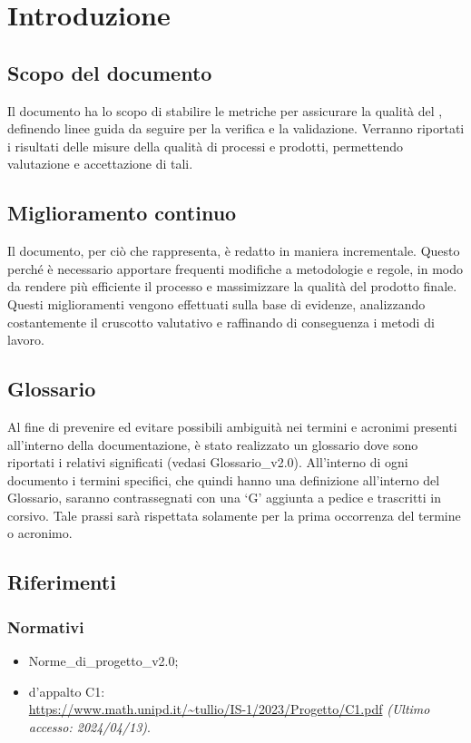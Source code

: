 \chapter{Introduzione}\label{chap:intro}

\section{Scopo del documento}
Il documento ha lo scopo di stabilire le metriche per assicurare la qualità del , definendo linee guida da seguire per la verifica e la validazione. Verranno riportati i risultati delle misure della qualità di processi e prodotti, permettendo valutazione e accettazione di tali.

\section{Miglioramento continuo}
Il documento, per ciò che rappresenta, è redatto in maniera incrementale. Questo perché è necessario apportare frequenti modifiche a metodologie e regole, in modo da rendere più efficiente il processo e massimizzare la qualità del prodotto finale. Questi miglioramenti vengono effettuati sulla base di evidenze, analizzando costantemente il cruscotto valutativo e raffinando di conseguenza i metodi di lavoro.

\section{Glossario}
Al fine di prevenire ed evitare possibili ambiguità nei termini e acronimi presenti all’interno della documentazione, è stato realizzato un glossario dove sono riportati i relativi significati (vedasi Glossario\_v2.0). All’interno di ogni documento i termini specifici, che quindi hanno una definizione all’interno del Glossario, saranno contrassegnati con una ‘G’ aggiunta a pedice e trascritti in corsivo. Tale prassi sarà rispettata solamente per la prima occorrenza del termine o acronimo.

\section{Riferimenti}
\subsection{Normativi}
\begin{itemize}
    \item Norme\_di\_progetto\_v2.0;
    \item {} d'appalto C1: \\ \url{https://www.math.unipd.it/~tullio/IS-1/2023/Progetto/C1.pdf} \textit{(Ultimo accesso: 2024/04/13)}.
\end{itemize}

